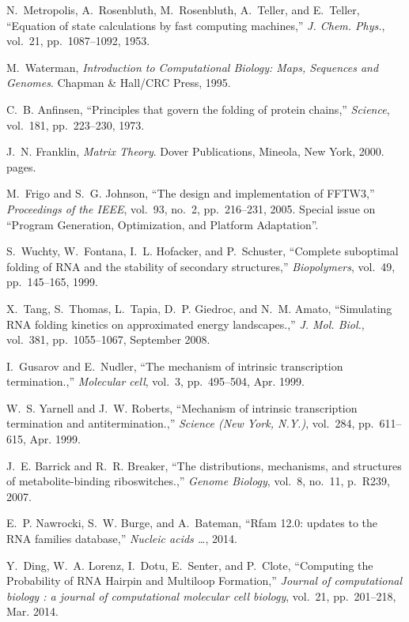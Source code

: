 \documentclass[11pt, oneside]{Thesis} %
\begin{document}
\begin{thebibliography}{100}
N.~Metropolis, A.~Rosenbluth, M.~Rosenbluth, A.~Teller, and E.~Teller,
  ``Equation of state calculations by fast computing machines,'' {\em J. Chem.
  Phys.}, vol.~21, pp.~1087--1092, 1953.

M.~Waterman, {\em Introduction to Computational Biology: {M}aps, Sequences and
  Genomes}.
\newblock Chapman \& Hall/CRC Press, 1995.

C.~B. Anfinsen, ``Principles that govern the folding of protein chains,'' {\em
  Science}, vol.~181, pp.~223--230, 1973.

J.~N. Franklin, {\em Matrix Theory}.
\newblock Dover Publications, Mineola, New York, 2000.
 pages.

M.~Frigo and S.~G. Johnson, ``The design and implementation of {FFTW3},'' {\em
  Proceedings of the IEEE}, vol.~93, no.~2, pp.~216--231, 2005.
\newblock Special issue on ``Program Generation, Optimization, and Platform
  Adaptation''.

S.~Wuchty, W.~Fontana, I.~L. Hofacker, and P.~Schuster, ``Complete suboptimal
  folding of {RNA} and the stability of secondary structures,'' {\em
  Biopolymers}, vol.~49, pp.~145--165, 1999.

X.~Tang, S.~Thomas, L.~Tapia, D.~P. Giedroc, and N.~M. Amato, ``Simulating
  {RNA} folding kinetics on approximated energy landscapes.,'' {\em J. Mol.
  Biol.}, vol.~381, pp.~1055--1067, September 2008.

I.~Gusarov and E.~Nudler, ``{The mechanism of intrinsic transcription
  termination.},'' {\em Molecular cell}, vol.~3, pp.~495--504, Apr. 1999.

W.~S. Yarnell and J.~W. Roberts, ``{Mechanism of intrinsic transcription
  termination and antitermination.},'' {\em Science (New York, N.Y.)},
  vol.~284, pp.~611--615, Apr. 1999.

J.~E. Barrick and R.~R. Breaker, ``{The distributions, mechanisms, and
  structures of metabolite-binding riboswitches.},'' {\em Genome Biology},
  vol.~8, no.~11, p.~R239, 2007.

E.~P. Nawrocki, S.~W. Burge, and A.~Bateman, ``{Rfam 12.0: updates to the RNA
  families database},'' {\em Nucleic acids {\ldots}}, 2014.

Y.~Ding, W.~A. Lorenz, I.~Dotu, E.~Senter, and P.~Clote, ``{Computing the
  Probability of RNA Hairpin and Multiloop Formation},'' {\em Journal of
  computational biology : a journal of computational molecular cell biology},
  vol.~21, pp.~201--218, Mar. 2014.

\end{thebibliography}
\end{document}
